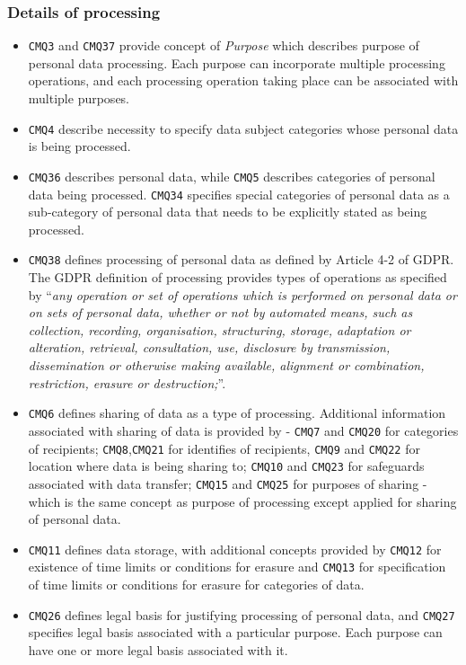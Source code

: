 \subsubsection{Details of processing}
\begin{itemize}
    \item \texttt{CMQ3} and \texttt{CMQ37} provide concept of \textit{Purpose} which describes purpose of personal data processing. Each purpose can incorporate multiple processing operations, and each processing operation taking place can be associated with multiple purposes.
    \item \texttt{CMQ4} describe necessity to specify data subject categories whose personal data is being processed.
    \item \texttt{CMQ36} describes personal data, while \texttt{CMQ5} describes categories of personal data being processed. \texttt{CMQ34} specifies special categories of personal data as a sub-category of personal data that needs to be explicitly stated as being processed.
    \item \texttt{CMQ38} defines processing of personal data as defined by Article 4-2 of GDPR. The GDPR definition of processing provides types of operations as specified by ``\textit{any operation or set of operations which is performed on personal data or on sets of personal data, whether or not by automated means, such as collection, recording, organisation, structuring, storage, adaptation or alteration, retrieval, consultation, use, disclosure by transmission, dissemination or otherwise making available, alignment or combination, restriction, erasure or destruction;}''.
    \item \texttt{CMQ6} defines sharing of data as a type of processing. Additional information associated with sharing of data is provided by - \texttt{CMQ7} and \texttt{CMQ20} for categories of recipients; \texttt{CMQ8},\texttt{CMQ21} for identifies of recipients, \texttt{CMQ9} and \texttt{CMQ22} for location where data is being sharing to; \texttt{CMQ10} and \texttt{CMQ23} for safeguards associated with data transfer; \texttt{CMQ15} and \texttt{CMQ25} for purposes of sharing - which is the same concept as purpose of processing except applied for sharing of personal data.
    \item \texttt{CMQ11} defines data storage, with additional concepts provided by \texttt{CMQ12} for existence of time limits or conditions for erasure and \texttt{CMQ13} for specification of time limits or conditions for erasure for categories of data.
    \item \texttt{CMQ26} defines legal basis for justifying processing of personal data, and \texttt{CMQ27} specifies legal basis associated with a particular purpose. Each purpose can have one or more legal basis associated with it.
\end{itemize}

